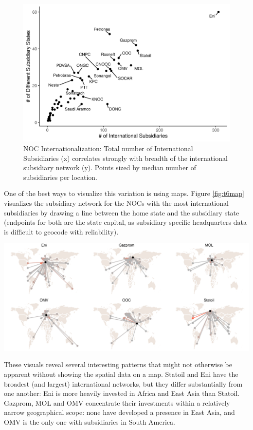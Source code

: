 \documentclass[11pt,]{book}
\begin{document}
\begin{figure}

{\centering \includegraphics[width=0.8\linewidth]{paper1fig/scatter01-1} 

}

\caption{NOC Internationalization: Total number of International Subsidiaries (x) correlates strongly with breadth of the international subsidiary network (y). Points sized by median number of subsidiaries per location.}\label{fig:scatter01}
\end{figure}

One of the best ways to visualize this variation is using maps. Figure \ref{fig:t6map} visualizes the subsidiary network for the NOCs with the most international subsidiaries by drawing a line between the home state and the subsidiary state (endpoints for both are the state capital, as subsidiary specific headquarters data is difficult to geocode with reliability).

\begin{center}\includegraphics{paper1fig/t6map-1} \end{center}

These visuals reveal several interesting patterns that might not otherwise be apparent without showing the spatial data on a map. Statoil and Eni have the broadest (and largest) international networks, but they differ substantially from one another: Eni is more heavily invested in Africa and East Asia than Statoil. Gazprom, MOL and OMV concentrate their investments within a relatively narrow geographical scope: none have developed a presence in East Asia, and OMV is the only one with subsidiaries in South America.
\end{document}
